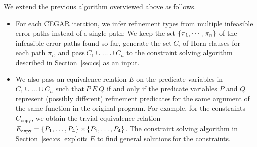 We extend the previous algorithm overviewed above as follows.
\begin{itemize}
\item For each CEGAR iteration, we infer refinement types from multiple
infeasible error paths instead of a single path:  We keep the set
\(\{{\pi_1,\cdots,\pi_n}\}\) of the infeasible error paths found so far,
generate the set \(C_i\) of Horn clauses for each path \(\pi_i\), and
pass \(C_1 \cup \dots \cup C_n\) to the constraint solving algorithm
described in Section~\ref{sec:cs} as an input.  %
\item We also pass an equivalence relation \(E\) on the predicate
variables in \(C_1 \cup \dots \cup C_n\) such that \(P\ E\ Q\) if and
only if the predicate variables \(P\) and \(Q\) represent (possibly
different) refinement predicates for the same argument of the same
function in the original program.  For example, for the constraints
\(C_{\texttt{copy}}\), we obtain the trivial equivalence relation
\(E_{\texttt{copy}}=\{{P_1,\dots,P_4}\} \times \{{P_1,\dots,P_4}\}\).
The constraint solving algorithm in Section~\ref{sec:cs} exploits \(E\)
to find general solutions for the constraints.
\end{itemize}



